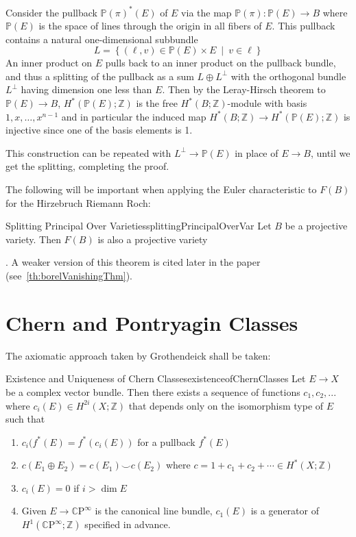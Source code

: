 \documentclass{book}
\newenvironment{Proof}[1][]
  {\begin{ProofTcb}[#1]}
  {\end{ProofTcb}}
\newcommand{\Z}{{\mathbb{Z}}}
\renewcommand{\P}{{\mathbb{P}}}
\newcommand{\CP}{{\mathbb{C}\mathrm{P}}}
\newcommand{\set}[2]{\left\{#1 \ \middle|\ #2\right\}}
\begin{document}
\begin{Proof}
	Consider the pullback $\P(\pi)^*(E)$ of $E$ via the map $\P(\pi):\P(E) \to B$ where $\P(E)$ is the space of
	lines through the origin in all fibers of $E$. This pullback contains a natural one-dimensional subbundle
	\[
		L = \set{(\ell,v) \in \P(E) \times E}{v \in \ell}
	\]
	An inner product on $E$ pulls back to an inner product on the pullback bundle, and thus a splitting of
	the pullback as a sum $L \oplus L^\perp$ with the orthogonal bundle $L^\perp$ having dimension one less
	than $E$. Then by the Leray-Hirsch theorem to $\P(E) \to B$, $H^*(\P(E);\Z)$
	is the free $H^*(B;\Z)$-module with basis $1,x,\ldots,x^{n-1}$ and in particular the induced map
	$H^*(B;\Z) \to H^*(\P(E);\Z)$ is injective since one of the basis elements is 1.

	This construction can be repeated with $L^\perp \to \P(E)$ in place of $E \to B$, until we get the
	splitting, completing the proof.
\end{Proof}

The following will be important when applying the Euler characteristic to $F(B)$ for the Hirzebruch Riemann
Roch:

\begin{thm}{Splitting Principal Over Varieties}{splittingPrincipalOverVar}
  Let $B$ be a projective variety. Then $F(B)$ is also a projective variety
\end{thm}

\begin{Proof}
  \cite{HodgeTheory2014}. A weaker version of this theorem is cited later in the paper
  (see~\cref{th:borelVanishingThm}).
\end{Proof}

\section{Chern and Pontryagin Classes}

The axiomatic approach taken by Grothendeick shall be taken:

\begin{thm}{Existence and Uniqueness of Chern Classes}{existenceofChernClasses}
	Let $E \to X$ be a complex vector bundle. Then there exists a sequence of functions $c_1, c_2, ...$ where
	$c_i(E) \in H^{2i}(X; \Z)$ that depends only on the isomorphism type of $E$ such that
	\begin{enumerate}
		\item $c_i(f^*(E) = f^*(c_i(E))$ for a pullback $f^*(E)$
		\item $c(E_1\oplus E_2) = c(E_1)\smile c(E_2)$ where $c = 1 + c_1 + c_2 + \cdots \in H^*(X;\Z)$
		\item $c_i(E) = 0$ if $i > \dim E$
		\item Given $E \to \CP^\infty$ is the canonical line bundle, $c_1(E)$ is a generator of
			$H^1(\CP^\infty; \Z)$ specified in advance.
	\end{enumerate}
\end{thm}
\end{document}
